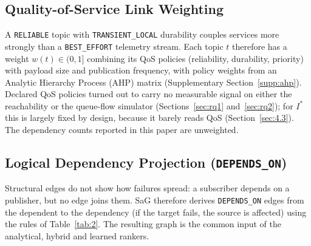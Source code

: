 \subsection{Quality-of-Service Link Weighting}
\label{sec:3.2}

A \texttt{RELIABLE} topic with \texttt{TRANSIENT\_LOCAL} durability couples services more strongly than a \texttt{BEST\_EFFORT} telemetry stream. Each topic $t$ therefore has a weight $w(t) \in (0, 1]$ combining its QoS policies (reliability, durability, priority) with payload size and publication frequency, with policy weights from an Analytic Hierarchy Process (AHP) \cite{saaty1980ahp} matrix (Supplementary Section~\ref{supp:ahp}). Declared QoS policies turned out to carry no measurable signal on either the reachability or the queue-flow simulator (Sections~\ref{sec:rq1} and~\ref{sec:rq2}); for $I^*$ this is largely fixed by design, because it barely reads QoS (Section~\ref{sec:4.3}). The dependency counts reported in this paper are unweighted.

\subsection{Logical Dependency Projection (\texttt{DEPENDS\_ON})}
\label{sec:3.3}

Structural edges do not show how failures spread: a subscriber depends on a publisher, but no edge joins them. SaG therefore derives \texttt{DEPENDS\_ON} edges from the dependent to the dependency (if the target fails, the source is affected) using the rules of Table~\ref{tab:2}. The resulting graph is the common input of the analytical, hybrid and learned rankers.

\begin{table}[htbp]
\centering
\small
\caption{The \texttt{DEPENDS\_ON} rules of the Application--Library projection evaluated in this study. Four infrastructure rules (Rules~2--4 and~6, for brokers and hosts) are formalized in Supplementary Section~\ref{supp:weights} but are not exercised by the Application-level evaluation.}
\label{tab:2}
\end{table}

